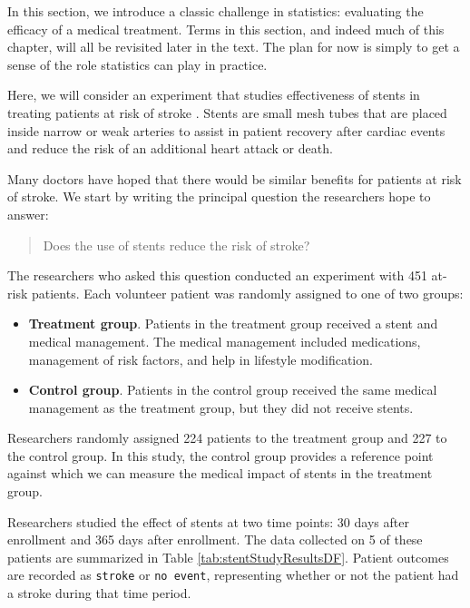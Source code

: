 \documentclass[
  10pt,
  openany]{book}
\providecommand{\tightlist}{%
  \setlength{\itemsep}{0pt}\setlength{\parskip}{0pt}}
\theoremstyle{definition}
\theoremstyle{definition}
\theoremstyle{definition}
\theoremstyle{definition}
\theoremstyle{remark}
\begin{document}

In this section, we introduce a classic challenge in statistics: evaluating the efficacy of a medical treatment.
Terms in this section, and indeed much of this chapter, will all be revisited later in the text.
The plan for now is simply to get a sense of the role statistics can play in practice.

Here, we will consider an experiment that studies effectiveness of stents in treating patients at risk of stroke \citep{chimowitz2011stenting}.
Stents are small mesh tubes that are placed inside narrow or weak arteries to assist in patient recovery after cardiac events and reduce the risk of an additional heart attack or death.

Many doctors have hoped that there would be similar benefits for patients at risk of stroke. We start by writing the principal question the researchers hope to answer:

\begin{quote}
Does the use of stents reduce the risk of stroke?
\end{quote}

The researchers who asked this question conducted an experiment with 451 at-risk patients. Each volunteer patient was randomly assigned to one of two groups:

\begin{itemize}
\tightlist
\item
  \textbf{Treatment group}. Patients in the treatment group received a stent and medical management.
  The medical management included medications, management of risk factors, and help in lifestyle modification.
\item
  \textbf{Control group}. Patients in the control group received the same medical management as the treatment group, but they did not receive stents.
\end{itemize}

Researchers randomly assigned 224 patients to the treatment group and 227 to the control group.
In this study, the control group provides a reference point against which we can measure the medical impact of stents in the treatment group.

Researchers studied the effect of stents at two time points: 30 days after enrollment and 365 days after enrollment.
The data collected on 5 of these patients are summarized in Table \ref{tab:stentStudyResultsDF}.
Patient outcomes are recorded as \texttt{stroke} or \texttt{no\ event}, representing whether or not the patient had a stroke during that time period.
\end{document}
